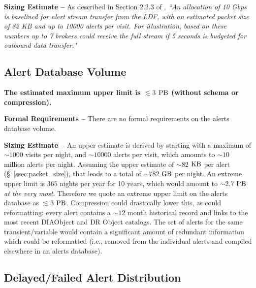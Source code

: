 \documentclass[DM,authoryear,toc]{lsstdoc}
\begin{document}
{\bf Sizing Estimate --} As described in Section 2.2.3 of , {\it ``An allocation of 10 Gbps is baselined for alert stream transfer from the LDF, with an estimated packet size of 82 KB and up to 10000 alerts per visit. For illustration, based on these numbers up to 7 brokers could receive the full stream if 5 seconds is budgeted for outbound data transfer."} 


\subsection{Alert Database Volume}\label{ssec:adb_volume}

{\bf The estimated maximum upper limit is $\lesssim3$ $\rm PB$ (without schema or compression).}

{\bf Formal Requirements --} There are no formal requirements on the alerts database volume.

{\bf Sizing Estimate --} An upper estimate is derived by starting with a maximum of $\sim1000$ visits per night, and $\sim10000$ alerts per visit, which amounts to $\sim10$ million alerts per night. 
Assuming the upper estimate of $\sim82$ $\rm KB$ per alert (\S~\ref{ssec:packet_size}), that leads to a total of $\sim782$ $\rm GB$ per night. An extreme upper limit is $365$ nights per year for 10 years, which would amount to $\sim2.7$ $\rm PB$ {\it at the very most}. Therefore we quote an extreme upper limit on the alerts database as $\lesssim3$ $\rm PB$. Compression could drastically lower this, as could reformatting: every alert contains a $\sim12$ month historical record and links to the most recent DIAObject and DR Object catalogs. The set of alerts for the same transient/variable would contain a significant amount of redundant information which could be reformatted (i.e., removed from the individual alerts and compiled elsewhere in an alerts database). 

\subsection{Delayed/Failed Alert Distribution}\label{ssec:OTR1}
\end{document}
